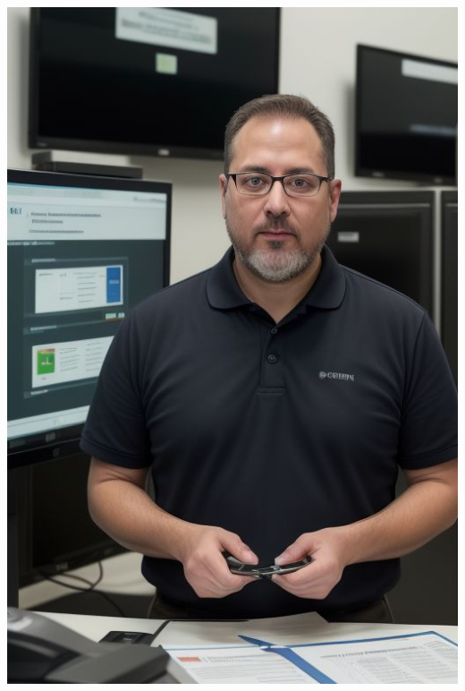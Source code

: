 \begin{minipage}[t]{0.3\textwidth} %
	\vspace{0pt} %
	\centering
	\vspace{0pt}
	\includegraphics[width=\textwidth]{../Draw.io diagrams/david.jpeg}
\end{minipage}%
\hfill
